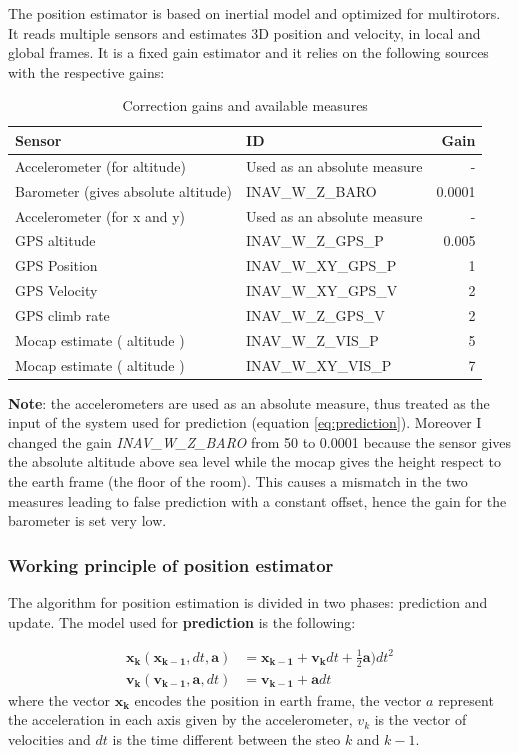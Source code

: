 The position estimator is based on inertial model and optimized for multirotors. It reads multiple sensors and estimates 3D position and velocity, in local and global frames. It is a fixed gain estimator and it relies on the following sources with the respective gains:
\begin{table}[H]
		\centering
	\begin{tabular}{l l r}
		\textbf{Sensor} & \textbf{ID} & \textbf{Gain} \\ \hline
		Accelerometer (for altitude) & Used as an absolute measure & - \\
		Barometer (gives absolute altitude)  & INAV\_W\_Z\_BARO & 0.0001  \\
		Accelerometer (for x and y) & Used as an absolute measure & - \\
		GPS altitude & INAV\_W\_Z\_GPS\_P & 0.005 \\
		GPS Position & INAV\_W\_XY\_GPS\_P & 1 \\
		GPS Velocity & INAV\_W\_XY\_GPS\_V & 2 \\
	    GPS climb rate & INAV\_W\_Z\_GPS\_V & 2 \\	
		Mocap estimate ( altitude ) & INAV\_W\_Z\_VIS\_P & 5 \\
		Mocap estimate ( altitude ) & INAV\_W\_XY\_VIS\_P & 7 \\
	\end{tabular}
	\caption{Correction gains and available measures}
	\label{tab:corrgain}
\end{table}
\noindent
\textbf{Note}: the accelerometers are used as an absolute measure, thus treated as the input of the system used for prediction (equation \ref{eq:prediction}). Moreover I changed the gain \textit{INAV\_W\_Z\_BARO} from 50 to 0.0001 because the sensor gives the absolute altitude above sea level while the mocap gives the height respect to the earth frame (the floor of the room). This causes a mismatch in the two measures leading to false prediction with a constant offset, hence the gain for the barometer is set very low.

\subsubsection*{Working principle of position estimator}
The algorithm for position estimation is divided in two phases: prediction and update. The model used for \textbf{prediction} is the following: 

\begin{equation}
	\begin{aligned}
	\boldsymbol{x_k}(\boldsymbol{x_{k-1}}, dt , \boldsymbol{a})& = \boldsymbol{x_{k-1}} + \boldsymbol{v_k}dt + \frac{1}{2}\boldsymbol{a}) dt^2 \\
	 \boldsymbol{v_k} ( \boldsymbol{v_{k-1}} ,\boldsymbol{a} , dt)& = \boldsymbol{v_{k-1}} + \boldsymbol{a}dt
	\end{aligned}
	\label{eq:prediction}
\end{equation}
where the vector $\boldsymbol{x_k}$ encodes the position in earth frame, the vector $a$ represent the acceleration in each axis given by the accelerometer, $v_k$ is the vector of velocities and $dt$ is the time different between the steo $k$ and $k-1$.\\

